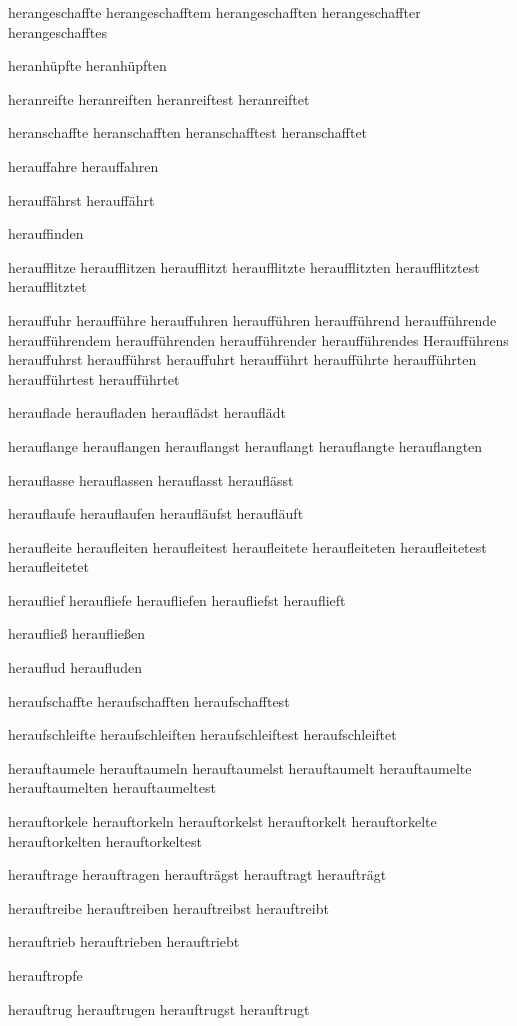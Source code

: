 herangeschaffte
herangeschafftem
herangeschafften
herangeschaffter
herangeschafftes

heranhüpfte
heranhüpften

heranreifte
heranreiften
heranreiftest
heranreiftet

heranschaffte
heranschafften
heranschafftest
heranschafftet

herauffahre
herauffahren

herauffährst
herauffährt

herauffinden

heraufflitze
heraufflitzen
heraufflitzt
heraufflitzte
heraufflitzten
heraufflitztest
heraufflitztet

herauffuhr
heraufführe
herauffuhren
heraufführen
heraufführend
heraufführende
heraufführendem
heraufführenden
heraufführender
heraufführendes
Heraufführens
herauffuhrst
heraufführst
herauffuhrt
heraufführt
heraufführte
heraufführten
heraufführtest
heraufführtet

herauflade
heraufladen
herauflädst
herauflädt

herauflange
herauflangen
herauflangst
herauflangt
herauflangte
herauflangten

herauflasse
herauflassen
herauflasst
herauflässt

herauflaufe
herauflaufen
heraufläufst
heraufläuft

heraufleite
heraufleiten
heraufleitest
heraufleitete
heraufleiteten
heraufleitetest
heraufleitetet

herauflief
heraufliefe
heraufliefen
heraufliefst
herauflieft

heraufließ
heraufließen

herauflud
heraufluden

heraufschaffte
heraufschafften
heraufschafftest

heraufschleifte
heraufschleiften
heraufschleiftest
heraufschleiftet

herauftaumele
herauftaumeln
herauftaumelst
herauftaumelt
herauftaumelte
herauftaumelten
herauftaumeltest

herauftorkele
herauftorkeln
herauftorkelst
herauftorkelt
herauftorkelte
herauftorkelten
herauftorkeltest

herauftrage
herauftragen
heraufträgst
herauftragt
heraufträgt

herauftreibe
herauftreiben
herauftreibst
herauftreibt

herauftrieb
herauftrieben
herauftriebt

herauftropfe

herauftrug
herauftrugen
herauftrugst
herauftrugt

